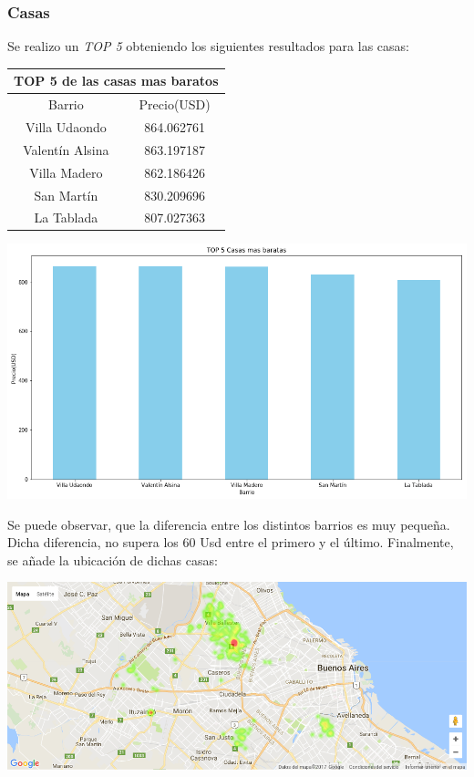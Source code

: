 \documentclass[a4paper, 10pt]{article}
\begin{document}
				\subsubsection{Casas}
				
				Se realizo un \emph{TOP 5} obteniendo los siguientes resultados para las casas:
				
					\begin{center}
						\begin{tabular}{ |c|c| }
							\hline
							\multicolumn{2}{|c|}{TOP 5 de las casas mas baratos}\\
							\hline
							\hline
							Barrio & Precio(USD)\\
							\hline
							Villa Udaondo & 864.062761 \\
							Valentín Alsina 	& 863.197187 \\
							Villa Madero & 862.186426 \\
							San Martín & 830.209696 \\
							La Tablada & 807.027363 \\
							\hline
						\end{tabular}
					\end{center}
				
				
				\begin{center}
   		    				\includegraphics[width=\textwidth]{images/topCb}
				\end{center}
				
				Se puede observar, que la diferencia entre los distintos barrios es muy pequeña. Dicha diferencia, no supera los 60 Usd entre el primero y el último.
				Finalmente, se añade la ubicación de dichas casas:
				
				\begin{center}
   		    				\includegraphics[width=\textwidth]{images/ubicCb}
				\end{center}
 
\end{document}
